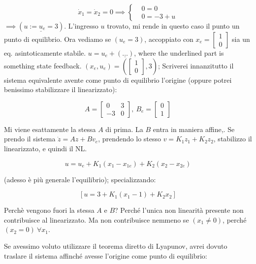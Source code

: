 \begin{itemize}
\[
	\dot{x}_1=\dot{x}_2=0 \implies
	\left\{
	\begin{aligned}
	&0 = 0\\
	&0 = -3+u
	\end{aligned}
	\right.
\]
$\implies (\underline{u := u_e=3})$. L'ingresso $u$ trovato, mi rende in questo caso il punto un punto di equilibrio. Ora vediamo se $(u_e=3)$, accoppiato con $x_e=\begin{bmatrix}1\\0\end{bmatrix}$ sia un eq. asintoticamente stabile. $u = u_e + (\underline{\dots})$, where the underlined part is something state feedback. $(x_e,u_e) = (\begin{bmatrix}1\\0\end{bmatrix}, 3)$; Scriverei innanzitutto il sistema equivalente avente come punto di equilibrio l'origine (oppure potrei benissimo stabilizzare il linearizzato):

\[
	A = \begin{bmatrix}0&3\\-3&0\end{bmatrix},\ B_e=\begin{bmatrix}0\\1\end{bmatrix}
\]

Mi viene esattamente la stessa $A$ di prima. La $B$ entra in maniera affine,. Se prendo il sistema $\dot{z}=Az + Bv_e$, prendendo lo stesso $v = K_1z_1+K_2z_2$, stabilizzo il linearizzato, e quindi il NL. 

\[
	u = u_e+K_1(x_1-x_{1e})+K_2(x_2-x_{2e})
\]

(adesso è più generale l'equilibrio); specializzando:

\[
	[u = 3 + K_1(x_1-1) + K_2x_2]
\]

Perchè vengono fuori la stessa $A$ e $B$? Perché l'unica non linearità presente non contribuisce al linearizzato. Ma non contribuisce nemmeno se $(x_1\neq 0)$, perché $(x_2=0)\ \forall x_1$.

Se avessimo voluto utilizzare il teorema diretto di Lyapunov, avrei dovuto traslare il sistema affinché avesse l'origine come punto di equilibrio:


\end{itemize}

